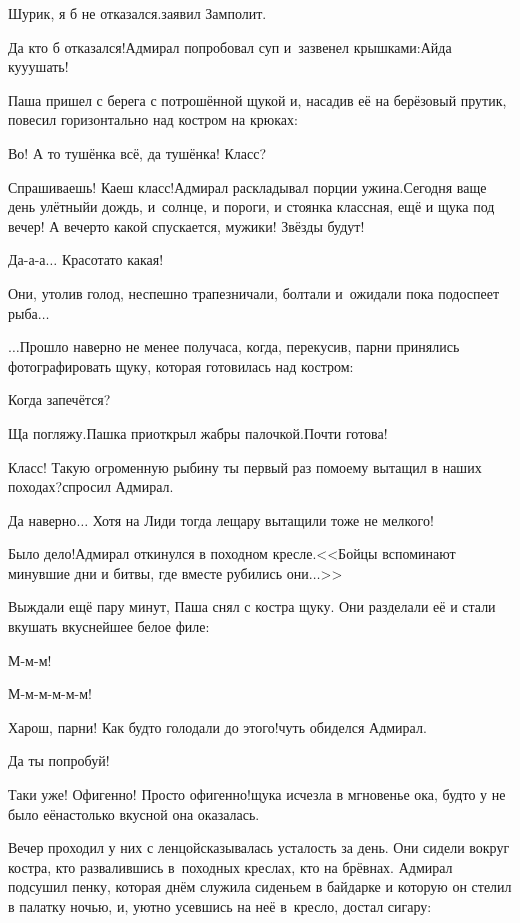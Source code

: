 \diagdash Шурик, я б не отказался.\mdash заявил Замполит.

\diagdash Да кто б отказался!\mdash Адмирал попробовал суп и~зазвенел крышками:\mdash Айда ку\sdash у\sdash ушать!

Паша пришел с берега с потрошённой щукой и, насадив её на берёзовый прутик, повесил горизонтально над костром на крюках:

\diagdash Во! А то тушёнка всё, да тушёнка! Класс?

\diagdash Спрашиваешь! Каеш класс!\mdash Адмирал раскладывал порции ужина.\mdash Сегодня ваще день улётный\mdash и дождь, и~солнце, и пороги, и стоянка классная, ещё и щука под вечер! А вечер\sdash то какой спускается, мужики! Звёзды будут!

\diagdash Да-а-а$\ldots$ Красота\sdash то какая!

Они, утолив голод, неспешно трапезничали, болтали и~ожидали пока подоспеет рыба$\ldots$

\vspace{0.5cm}
$\ldots$Прошло наверно не менее получаса, когда, перекусив, парни принялись фотографировать щуку, которая готовилась над костром:

\diagdash Когда запечётся?

\diagdash Ща погляжу.\mdash Пашка приоткрыл жабры палочкой.\mdash Почти готова!

\diagdash Класс! Такую огроменную рыбину ты первый раз по\sdash моему вытащил в наших походах?\mdash спросил Адмирал.

\diagdash Да наверно$\ldots$ Хотя на Лиди тогда лещару вытащили тоже не мелкого! 

\diagdash Было дело!\mdash Адмирал откинулся в походном кресле.\mdash <<Бойцы вспоминают минувшие дни и битвы, где вместе рубились они$\ldots$>>

Выждали ещё пару минут, Паша снял с костра щуку. Они разделали её и стали вкушать вкуснейшее белое филе:

\diagdash М-м-м!

\diagdash М-м-м-м-м-м!

\diagdash Харош, парни! Как будто голодали до этого!\mdash чуть обиделся Адмирал.

\diagdash Да ты попробуй!

\diagdash Таки уже! Офигенно! Просто офигенно!\mdash щука исчезла в мгновенье ока, будто у не было её\mdash настолько вкусной она оказалась.

Вечер проходил у них с ленцой\mdash сказывалась усталость за день. Они сидели вокруг костра, кто развалившись в~походных креслах, кто на брёвнах. Адмирал подсушил пенку, которая днём служила сиденьем в байдарке и которую он стелил в палатку ночью, и, уютно усевшись на неё в~кресло, достал сигару:

